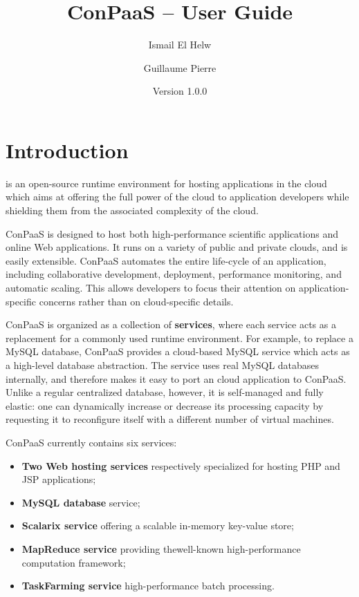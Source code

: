 \documentclass[10pt]{article}
\title{ConPaaS -- User Guide}
\author{Ismail El Helw \and Guillaume Pierre}
\date{Version 1.0.0}
\begin{document}
\maketitle

\T\vfil
\T\tableofcontents
\T\vfil
\T\newpage

\section{Introduction}

 is an open-source runtime
environment for hosting applications in the cloud which aims at
offering the full power of the cloud to application developers while
shielding them from the associated complexity of the cloud.

ConPaaS is designed to host both high-performance scientific
applications and online Web applications. It runs on a variety of
public and private clouds, and is easily extensible.  ConPaaS
automates the entire life-cycle of an application, including
collaborative development, deployment, performance monitoring, and
automatic scaling. This allows developers to focus their attention on
application-specific concerns rather than on cloud-specific details.

ConPaaS is organized as a collection of \textbf{services}, where each
service acts as a replacement for a commonly used runtime environment.
For example, to replace a MySQL database, ConPaaS provides a
cloud-based MySQL service which acts as a high-level database
abstraction. The service uses real MySQL databases internally, and
therefore makes it easy to port an cloud application to ConPaaS.
Unlike a regular centralized database, however, it is self-managed and
fully elastic: one can dynamically increase or decrease its processing
capacity by requesting it to reconfigure itself with a different
number of virtual machines.

ConPaaS currently contains six services: 

\begin{itemize}
\item \textbf{Two Web hosting services} respectively specialized for
  hosting PHP and JSP applications;
\item \textbf{MySQL database} service;
\item \textbf{Scalarix service} offering a scalable in-memory
  key-value store;
\item \textbf{MapReduce service} providing thewell-known
  high-performance computation framework;
\item \textbf{TaskFarming service} high-performance batch processing.
\end{itemize}
\end{document}
